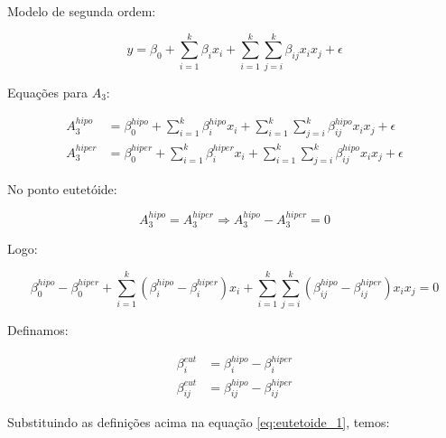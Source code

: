 \documentclass{article}
\begin{document}
Modelo de segunda ordem:

\begin{equation}
	y = \beta_0 + \sum_{i=1}^k \beta_i x_i + \sum_{i=1}^{k} \sum_{j=i}^k \beta_{ij} x_i x_j + \epsilon
\end{equation}





Equações para $A_3$:

\begin{align}
	A_3^{hipo} &= \beta_0^{hipo} + \sum_{i=1}^k \beta_i^{hipo} x_i + \sum_{i=1}^{k} \sum_{j=i}^k \beta_{ij}^{hipo} x_i x_j + \epsilon \\
	A_3^{hiper} &= \beta_0^{hiper} + \sum_{i=1}^k \beta_i^{hiper} x_i + \sum_{i=1}^{k} \sum_{j=i}^k \beta_{ij}^{hipo} x_i x_j + \epsilon
\end{align}

No ponto eutetóide:

\begin{equation}
	A_3^{hipo} = A_3^{hiper} \Rightarrow A_3^{hipo} - A_3^{hiper} = 0
\end{equation}

Logo:

\begin{equation}
	\beta_0^{hipo} - \beta_0^{hiper} 
	+ \sum_{i=1}^k \left(\beta_i^{hipo} - \beta_i^{hiper}\right) x_i 
	+ \sum_{i=1}^{k} \sum_{j=i}^k \left(\beta_{ij}^{hipo} - \beta_{ij}^{hiper}\right) x_i x_j = 0
	\label{eq:eutetoide_1}
\end{equation}

Definamos:

\begin{align}
	\beta_i^{eut} &= \beta_i^{hipo} - \beta_i^{hiper} \\
	\beta_{ij}^{eut} &= \beta_{ij}^{hipo} - \beta_{ij}^{hiper}
\end{align}

Substituindo as definições acima na equação \ref{eq:eutetoide_1}, temos:
\end{document}

